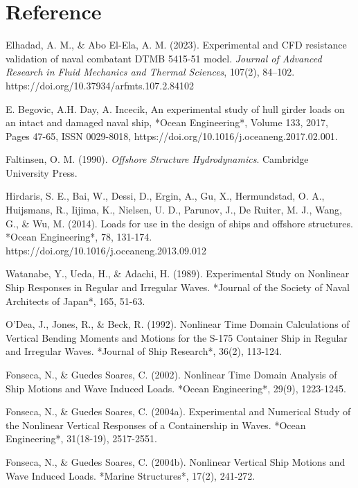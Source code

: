 \documentclass[12pt]{article} %
\begin{document}
\section{Reference}
\begin{thebibliography}{99}
     Elhadad, A. M., \& Abo El-Ela, A. M. (2023). Experimental and CFD resistance validation of naval combatant DTMB 5415-51 model. \textit{Journal of Advanced Research in Fluid Mechanics and Thermal Sciences}, 107(2), 84–102. https://doi.org/10.37934/arfmts.107.2.84102
    
     E. Begovic, A.H. Day, A. Incecik, An experimental study of hull girder loads on an intact and damaged naval ship, *Ocean Engineering*, Volume 133, 2017, Pages 47-65, ISSN 0029-8018, https://doi.org/10.1016/j.oceaneng.2017.02.001.

     Faltinsen, O. M. (1990). \textit{Offshore Structure Hydrodynamics}. Cambridge University Press.

     Hirdaris, S. E., Bai, W., Dessi, D., Ergin, A., Gu, X., Hermundstad, O. A., Huijsmans, R., Iijima, K., Nielsen, U. D., Parunov, J., De Ruiter, M. J., Wang, G., \& Wu, M. (2014). Loads for use in the design of ships and offshore structures. *Ocean Engineering*, 78, 131-174. https://doi.org/10.1016/j.oceaneng.2013.09.012
    
     Watanabe, Y., Ueda, H., \& Adachi, H. (1989). Experimental Study on Nonlinear Ship Responses in Regular and Irregular Waves. *Journal of the Society of Naval Architects of Japan*, 165, 51-63.

     O'Dea, J., Jones, R., \& Beck, R. (1992). Nonlinear Time Domain Calculations of Vertical Bending Moments and Motions for the S-175 Container Ship in Regular and Irregular Waves. *Journal of Ship Research*, 36(2), 113-124.

     Fonseca, N., \& Guedes Soares, C. (2002). Nonlinear Time Domain Analysis of Ship Motions and Wave Induced Loads. *Ocean Engineering*, 29(9), 1223-1245.

     Fonseca, N., \& Guedes Soares, C. (2004a). Experimental and Numerical Study of the Nonlinear Vertical Responses of a Containership in Waves. *Ocean Engineering*, 31(18-19), 2517-2551.

     Fonseca, N., \& Guedes Soares, C. (2004b). Nonlinear Vertical Ship Motions and Wave Induced Loads. *Marine Structures*, 17(2), 241-272.


\end{thebibliography}
\end{document}
